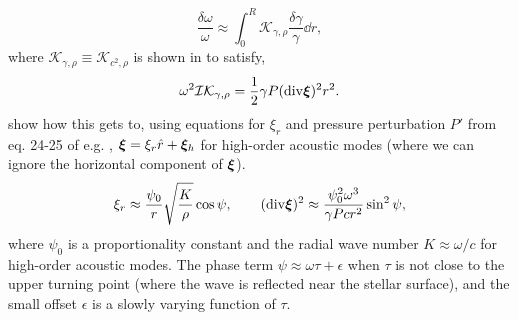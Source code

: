 %
\begin{equation}
    \frac{\delta\omega}{\omega} \approx \int_0^R \mathcal{K}_{\gamma,\rho} \frac{\delta\gamma}{\gamma} \dd r,\label{eq:delta-omega}
\end{equation}
%
where \(\mathcal{K}_{\gamma,\rho} \equiv \mathcal{K}_{c^2,\rho}\) is shown in \citet{Gough1993} to satisfy,
%
\begin{equation}
    \omega^2 \mathcal{I}\mathcal{K}_{\gamma,\rho} = \frac12 \gamma P (\mathrm{div} \bm{\xi})^2 r^2.\label{eq:gamma-kernel}
\end{equation}
%
show how this gets to, using equations for \(\xi_r\) and pressure perturbation \(P'\) from eq. 24-25 of e.g. \citet{Shibahashi1979}, \(\bm{\xi} = \xi_r \hat{r} + \bm{\xi}_h\) for high-order acoustic modes (where we can ignore the horizontal component of \(\bm{\xi}\)).
%
\begin{equation}
    \xi_r \approx \frac{\psi_0}{r}\sqrt{\frac{K}{\rho}} \cos\psi,\qquad
    (\mathrm{div} \bm{\xi})^2 \approx \frac{\psi_0^2 \omega^3}{\gamma P c r^2} \sin^2\psi, \label{eq:xi-approx}
\end{equation}
%
where \(\psi_0\) is a proportionality constant and the radial wave number \(K \approx \omega / c\) for high-order acoustic modes. The phase term \(\psi \approx \omega \tau + \epsilon\) when \(\tau\) is not close to the upper turning point (where the wave is reflected near the stellar surface), and the small offset \(\epsilon\) is a slowly varying function of \(\tau\).

